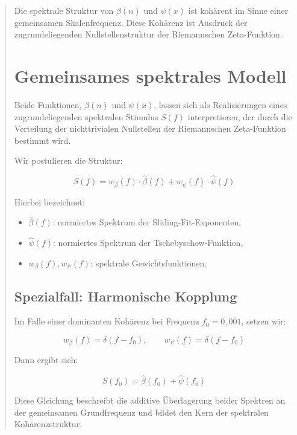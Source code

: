 \documentclass[12pt]{article}
\begin{document}
\begin{quote}
Die spektrale Struktur von $\beta(n)$ und $\psi(x)$ ist kohärent im Sinne einer gemeinsamen Skalenfrequenz. Diese Kohärenz ist Ausdruck der zugrundeliegenden Nullstellenstruktur der Riemannschen Zeta-Funktion.

\section{Gemeinsames spektrales Modell}

Beide Funktionen, $\beta(n)$ und $\psi(x)$, lassen sich als Realisierungen eines zugrundeliegenden spektralen Stimulus $S(f)$ interpretieren, der durch die Verteilung der nichttrivialen Nullstellen der Riemannschen Zeta-Funktion bestimmt wird.

Wir postulieren die Struktur:

\begin{equation}
S(f) = w_\beta(f) \cdot \widehat{\beta}(f) + w_\psi(f) \cdot \widehat{\psi}(f)
\end{equation}

Hierbei bezeichnet:
\begin{itemize}
  \item $\widehat{\beta}(f)$: normiertes Spektrum der Sliding-Fit-Exponenten,
  \item $\widehat{\psi}(f)$: normiertes Spektrum der Tschebyschow-Funktion,
  \item $w_\beta(f), w_\psi(f)$: spektrale Gewichtsfunktionen.
\end{itemize}

\subsection*{Spezialfall: Harmonische Kopplung}

Im Falle einer dominanten Kohärenz bei Frequenz $f_0 = 0{,}001$, setzen wir:

\begin{equation}
w_\beta(f) = \delta(f - f_0), \qquad w_\psi(f) = \delta(f - f_0)
\end{equation}

Dann ergibt sich:

\begin{equation}
S(f_0) = \widehat{\beta}(f_0) + \widehat{\psi}(f_0)
\end{equation}

Diese Gleichung beschreibt die additive Überlagerung beider Spektren an der gemeinsamen Grundfrequenz und bildet den Kern der spektralen Kohärenzstruktur.


\end{quote}
\end{document}

